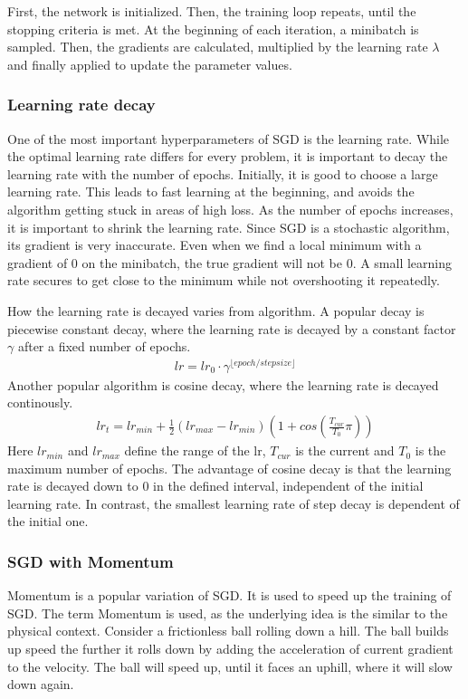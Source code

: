 First, the network is initialized. Then, the training loop repeats, until the
stopping criteria is met. At the beginning of each iteration, a minibatch is sampled. Then, the
gradients are calculated, multiplied by the learning rate $\lambda$ and finally
applied to update the parameter values.


\subsubsection{Learning rate decay}\label{sub:Learing_rate_decay}
One of the most important hyperparameters of SGD is the learning rate. While the
optimal learning rate differs for every problem, it is important to decay the
learning rate with the number of epochs. Initially, it is good to choose a large
learning rate. This leads to fast learning at the beginning, and avoids the
algorithm getting stuck in areas of high loss. As the number of epochs
increases, it is important to shrink the learning rate. Since SGD is a
stochastic algorithm, its gradient is very inaccurate. Even when we find a local
minimum with a gradient of 0 on the minibatch, the true gradient will not be 0.
A small learning rate secures to get close to the minimum while not overshooting
it repeatedly.

How the learning rate is decayed varies from algorithm. A popular decay is
piecewise constant decay, where the learning rate is decayed by a constant
factor $\gamma$ after a fixed number of epochs.
\begin{align}
    lr = lr_0 \cdot \gamma^{\lfloor epoch/stepsize \rfloor}
\end{align}
Another popular algorithm is cosine decay, where the learning rate is decayed
continously.
\begin{align}\label{eq:cosine_decay}
    lr_t = lr_{min} + \frac{1}{2} (lr_{max} - lr_{min})(1+cos(\frac{T_{cur}}{T_0}\pi))
\end{align}
Here $lr_{min}$ and $lr_{max}$ define the range of the lr, $T_{cur}$
is the current and $T_0$ is the maximum number of epochs. The advantage of
cosine decay is that the learning rate is decayed down to 0 in the defined
interval, independent of the initial learning rate. In contrast, the smallest
learning rate of step decay is dependent of the initial one.

\subsubsection{SGD with Momentum}\label{sub:Momentum}
Momentum is a popular variation of SGD. It is used to speed up the training of
SGD. The term Momentum is used, as the underlying idea is the similar to the
physical context. Consider a frictionless ball rolling down a hill. The ball
builds up speed the further it rolls down by adding the acceleration of current
gradient to the velocity. The ball will speed up, until it faces an uphill,
where it will slow down again.

